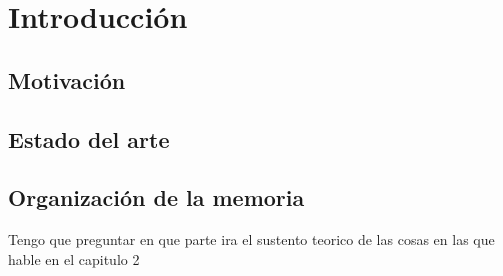 

\chapter{Introducción}
\label{ch:chapter1}

\section{Motivación}


\section{Estado del arte}

\section{Organización de la memoria}

Tengo que preguntar en que parte ira el sustento teorico de las cosas en las que hable en el capitulo 2
